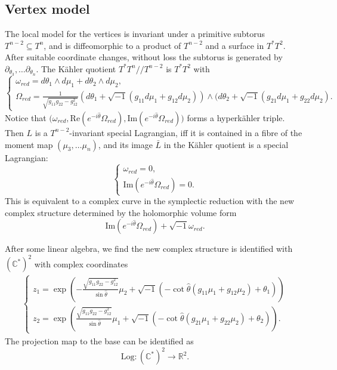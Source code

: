 \documentclass{article}
\theoremstyle{definition}
\newcommand{\R}{\mathbb{R}}
\newcommand{\C}{\mathbb{C}}
\begin{document}
	
	
	
	
	
	
	
	
	\subsection{Vertex model}
	
	
	The local model for the vertices is invariant under a primitive subtorus $T^{n-2}\subseteq T^n$, and is diffeomorphic to a product of $T^{n-2}$ and a surface in $T^*T^2$. After suitable coordinate changes, without loss the subtorus is generated by $\partial_{\theta_3},\ldots \partial_{\theta_n}$. 
	The K\"ahler quotient $T^*T^n // T^{n-2}$ is $T^*T^2$ with 
	\[
	\begin{cases}
		\omega_{red}= d\theta_1\wedge d\mu_1+ d\theta_2\wedge d\mu_2,
		\\
		\Omega_{red}= \frac{1}{ \sqrt{ g_{11} g_{22}- g_{12}^2 }  } (d\theta_1+ \sqrt{-1} (g_{11} d\mu_1+ g_{12} d\mu_2) )\wedge (d\theta_2+ \sqrt{-1} (g_{21} d\mu_1+ g_{22} d\mu_2).
	\end{cases}
	\]
	Notice that  $\big(\omega_{red}, \text{Re}(e^{-i\hat{\theta} } \Omega_{red}),   \text{Im}(e^{-i\hat{\theta} } \Omega_{red})\big) $ forms a hyperk\"ahler triple. Then $L$ is a $T^{n-2}$-invariant special Lagrangian, iff it is contained in a fibre of the moment map $(\mu_3,\ldots \mu_n)$, and its image $\bar{L}$ in the K\"ahler quotient is a special Lagrangian:
	\[
	\begin{cases}
		\omega_{red}= 0,
		\\
		\text{Im}(e^{-i\hat{\theta} } \Omega_{red})=0.
	\end{cases}
	\]
	This is equivalent to a complex curve in the symplectic reduction with the new complex structure determined by the holomorphic volume form $$\text{Im}(e^{-i\hat{\theta} } \Omega_{red})+ \sqrt{-1}\omega_{red}. $$
	
	
	After some linear algebra, we find the new complex structure is identified with $(\C^*)^2$ with complex coordinates
	\begin{align}\label{eq: HK rel}
		\begin{cases}
			z_1= \exp \left( - \frac{ \sqrt{ g_{11} g_{22}- g_{12}^2 }     }{ \sin \hat{\theta} } \mu_2+   \sqrt{-1} ( -\cot \hat{\theta} ( g_{11}\mu_1+ g_{12}\mu_2 )+ \theta_1   )      \right)
			\\
			z_2=\exp \left(  \frac{ \sqrt{ g_{11} g_{22}- g_{12}^2 }     }{ \sin \hat{\theta} } \mu_1+   \sqrt{-1} ( -\cot \hat{\theta} ( g_{21}\mu_1+ g_{22}\mu_2 )+ \theta_2   )      \right).
		\end{cases}
	\end{align}
	The projection map to the base can be identified as 
	\[
	\text{Log}:(\C^*)^2\to \R^2.
	\]
	
\end{document}
